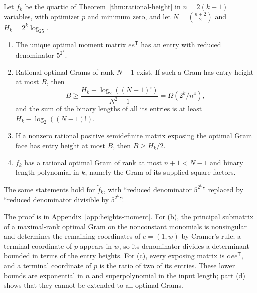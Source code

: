 \begin{corollary}
\label{cor:heights-gram}
Let $f_k$ be the quartic of Theorem~\ref{thm:rational-height} in
$n=2(k+1)$ variables, with optimizer $p$ and minimum zero, and let
$N=\binom{n+2}{2}$ and $H_k=2^k\log_25$.
\begin{enumerate}[label=(\alph*)]
\item The unique optimal moment matrix $ee^{\mathsf T}$ has an entry with
  reduced denominator $5^{2^k}$.
\item Rational optimal Grams of rank $N-1$ exist. If such a Gram has entry
  height at most $B$, then
  \[
   B\ge\frac{H_k-\log_2((N-1)!)}{N^2-1}=\Omega(2^k/n^4),
  \]
  and the sum of the binary lengths of all its entries is at least
  $H_k-\log_2((N-1)!)$.
\item If a nonzero rational positive semidefinite matrix exposing the optimal
  Gram face has entry height at most $B$, then $B\ge H_k/2$.
\item $f_k$ has a rational optimal Gram of rank at most $n+1<N-1$ and binary
  length polynomial in $k$, namely the Gram of its supplied square factors.
\end{enumerate}
The same statements hold for $\tilde f_k$, with ``reduced denominator
$5^{2^k}$'' replaced by ``reduced denominator divisible by $5^{2^k}$''.
\end{corollary}

The proof is in Appendix~\ref{app:heights-moment}. For (b), the principal
submatrix of a maximal-rank optimal Gram on the nonconstant monomials is
nonsingular and determines the remaining coordinates of $e=(1,w)$ by Cramer's
rule; a terminal coordinate of $p$ appears in $w$, so its denominator divides
a determinant bounded in terms of the entry heights. For (c), every exposing
matrix is $c\,ee^{\mathsf T}$, and a terminal coordinate of $p$ is the ratio
of two of its entries. These lower bounds are exponential in $n$ and
superpolynomial in the input length; part (d) shows that they cannot be
extended to all optimal Grams.

